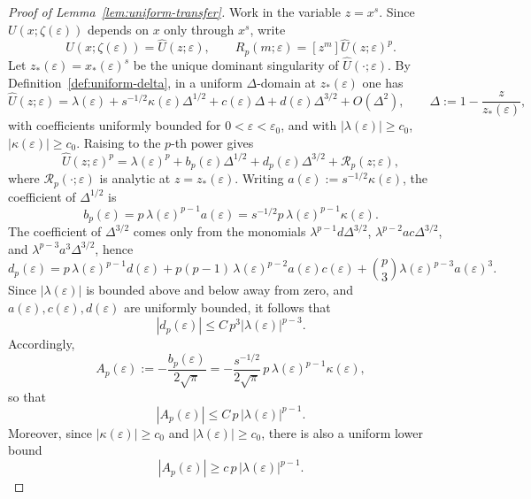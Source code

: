 \documentclass[11pt]{amsart}
\numberwithin{equation}{section}
\theoremstyle{plain}
\theoremstyle{definition}
\theoremstyle{remark}
\begin{document}
\begin{proof}[Proof of Lemma~\ref{lem:uniform-transfer}]
Work in the variable \(z=x^s\). Since \(U(x;\zeta(\varepsilon))\) depends on
\(x\) only through \(x^s\), write
\[
U(x;\zeta(\varepsilon))=\widehat U(z;\varepsilon),
\qquad
R_p(m;\varepsilon)=[z^m]\widehat U(z;\varepsilon)^p .
\]
Let \(z_*(\varepsilon)=x_*(\varepsilon)^s\) be the unique dominant singularity
of \(\widehat U(\cdot;\varepsilon)\). By
Definition~\ref{def:uniform-delta}, in a uniform \(\Delta\)-domain at
\(z_*(\varepsilon)\) one has
\[
\widehat U(z;\varepsilon)
=
\lambda(\varepsilon)
+
s^{-1/2}\kappa(\varepsilon)\Delta^{1/2}
+
c(\varepsilon)\Delta
+
d(\varepsilon)\Delta^{3/2}
+
O(\Delta^2),
\qquad
\Delta:=1-\frac{z}{z_*(\varepsilon)},
\]
with coefficients uniformly bounded for \(0<\varepsilon<\varepsilon_0\), and
with $|\lambda(\varepsilon)|\ge c_0$, $|\kappa(\varepsilon)|\ge c_0$. Raising to the \(p\)-th power gives
\[
\widehat U(z;\varepsilon)^p
=
\lambda(\varepsilon)^p
+
b_p(\varepsilon)\Delta^{1/2}
+
d_p(\varepsilon)\Delta^{3/2}
+
\mathcal R_p(z;\varepsilon),
\]
where \(\mathcal R_p(\cdot;\varepsilon)\) is analytic at
\(z=z_*(\varepsilon)\). Writing $a(\varepsilon):=s^{-1/2}\kappa(\varepsilon)$,
the coefficient of \(\Delta^{1/2}\) is
\[
b_p(\varepsilon)
=
p\,\lambda(\varepsilon)^{p-1}a(\varepsilon)
=
s^{-1/2}p\,\lambda(\varepsilon)^{p-1}\kappa(\varepsilon).
\]
The coefficient of \(\Delta^{3/2}\) comes only from the monomials
\(\lambda^{p-1}d\Delta^{3/2}\), \(\lambda^{p-2}ac\Delta^{3/2}\), and
\(\lambda^{p-3}a^3\Delta^{3/2}\), hence
\[
d_p(\varepsilon)
=
p\,\lambda(\varepsilon)^{p-1}d(\varepsilon)
+
p(p-1)\,\lambda(\varepsilon)^{p-2}a(\varepsilon)c(\varepsilon)
+
\binom{p}{3}\lambda(\varepsilon)^{p-3}a(\varepsilon)^3.
\]
Since \(|\lambda(\varepsilon)|\) is bounded above and below away from zero,
and \(a(\varepsilon),c(\varepsilon),d(\varepsilon)\) are uniformly bounded,
it follows that
\[
|d_p(\varepsilon)|
\le
C\,p^3|\lambda(\varepsilon)|^{p-3}.
\]
Accordingly,
\[
A_p(\varepsilon)
:=
-\frac{b_p(\varepsilon)}{2\sqrt{\pi}}
=
-\frac{s^{-1/2}}{2\sqrt{\pi}}\,p\,\lambda(\varepsilon)^{p-1}\kappa(\varepsilon),
\]
so that
\begin{equation}\label{eq:Ap-growth-app}
|A_p(\varepsilon)|
\le
C\,p\,|\lambda(\varepsilon)|^{p-1}.
\end{equation}
Moreover, since $|\kappa(\varepsilon)|\ge c_0$ and $|\lambda(\varepsilon)|\ge c_0$,
there is also a uniform lower bound
\begin{equation}\label{eq:Ap-growth-lower-app}
|A_p(\varepsilon)|
\ge
c\,p\,|\lambda(\varepsilon)|^{p-1}.
\end{equation}


\end{proof}
\end{document}
